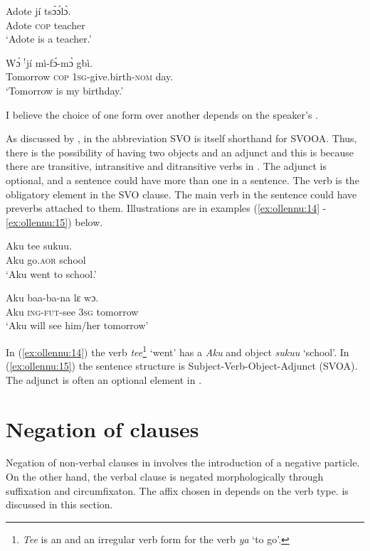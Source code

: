 \documentclass[output=paper,newtxmath,modfonts,nonflat,draftmode]{langsci/langscibook}
\begin{document}
\ea \label{ex:ollennu:12}
\gll Adote jí ts\`ɔ\'ɔl\`ɔ.\\
Adote \textsc{cop} teacher\\
\glt`Adote is a teacher.'
\z

\ea \label{ex:ollennu:13}
\gll W\'ɔ $^{!}$jí mì-f\'ɔ-m\`ɔ gbì.\\
Tomorrow \textsc{cop} 1\textsc{sg}-give.birth-\textsc{nom} day.\\
\glt `Tomorrow is my birthday.'
\z


I believe the choice of one form over another depends on the speaker’s .

As discussed by \citet{Dakubu2003}, in  the abbreviation SVO is itself shorthand for SVOOA. Thus, there is the possibility of having two objects and an adjunct and this is because there are transitive, intransitive and ditransitive verbs in . The adjunct is optional, and a sentence could have more than one in a sentence. The verb is the obligatory element in the SVO clause. The main verb in the sentence could have preverbs attached to them. Illustrations are in examples (\ref{ex:ollennu:14} -\ref{ex:ollennu:15}) below.

\ea \label{ex:ollennu:14}
\gll Aku tee sukuu.\\
Aku go.\textsc{aor} school\\
\glt `Aku went to school.'
\z

\ea \label{ex:ollennu:15}
 \gll Aku baa-ba-na lɛ wɔ.\\
Aku \textsc{ing}-\textsc{fut}-see 3\textsc{sg} tomorrow\\
\glt`Aku will see him/her tomorrow'
\z


In (\ref{ex:ollennu:14}) the verb \textit{tee}\footnote{\textit{Tee} is an  and an irregular verb form for the verb \textit{ya} `to go'.} `went' has a  \textit{Aku} and object \textit{sukuu} `school'. In (\ref{ex:ollennu:15}) the sentence structure is Subject-Verb-Object-Adjunct (SVOA). The adjunct is often an optional element in .

\section{\label{sec:ollennu:2} Negation of clauses}


Negation of non-verbal clauses in  involves the introduction of a {negative particle}. On the other hand, the verbal clause is negated morphologically through suffixation and circumfixaton. The affix chosen in  depends on the verb type.   is discussed in this section.
\end{document}
